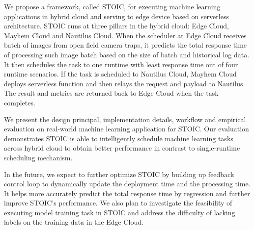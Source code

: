 We propose a framework, called STOIC, for executing machine learning applications in hybrid cloud and serving to edge device based on serverless architecture. STOIC runs at three pillars in the hybrid cloud: Edge Cloud, Mayhem Cloud and Nautilus Cloud. When the scheduler at Edge Cloud receives batch of images from open field camera traps, it predicts the total response time of processing such image batch based on the size of batch and historical log data. It then schedules the task to one runtime with least response time out of four runtime scenarios. If the task is scheduled to Nautilus Cloud, Mayhem Cloud deploys serverless function and then relays the request and payload to Nautilus. The result and metrics are returned back to Edge Cloud when the task completes.

We present the design principal, implementation details, workflow and empirical evaluation on real-world machine learning application for STOIC. Our evaluation demonstrates STOIC is able to intelligently schedule machine learning tasks across hybrid cloud to obtain better performance in contrast to single-runtime scheduling mechanism.

In the future, we expect to further optimize STOIC by building up feedback control loop to dynamically update the deployment time and the processing time. It helps more accurately predict the total response time by regression and further improve STOIC's performance. We also plan to investigate the feasibility of executing model training task in STOIC and address the difficulty of lacking labels on the training data in the Edge Cloud.